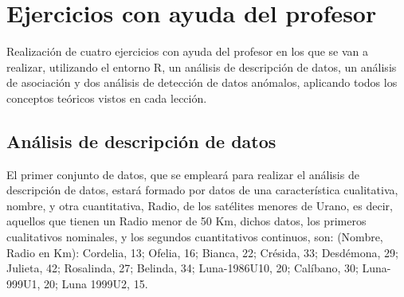 \documentclass[a4paper, 12pt]{article}
\begin{document}
	\section{Ejercicios con ayuda del profesor}
	Realización de cuatro ejercicios con ayuda del profesor en los que se van a realizar, utilizando el entorno R, un análisis de descripción de datos, un análisis de asociación y dos análisis de detección de datos anómalos, aplicando todos los conceptos teóricos vistos en cada lección.

	\subsection{Análisis de descripción de datos}
	El primer conjunto de datos, que se empleará para realizar el análisis de descripción de datos, estará formado por datos de una característica cualitativa, nombre, y otra cuantitativa, Radio, de los satélites menores de Urano, es decir, aquellos que tienen un Radio menor de 50 Km, dichos datos, los primeros cualitativos nominales, y los segundos cuantitativos continuos, son: (Nombre, Radio en Km): Cordelia, 13; Ofelia, 16; Bianca, 22; Crésida, 33; Desdémona, 29; Julieta, 42; Rosalinda, 27; Belinda, 34; Luna-1986U10, 20; Calíbano, 30; Luna-999U1, 20; Luna 1999U2, 15.
	
\end{document}
